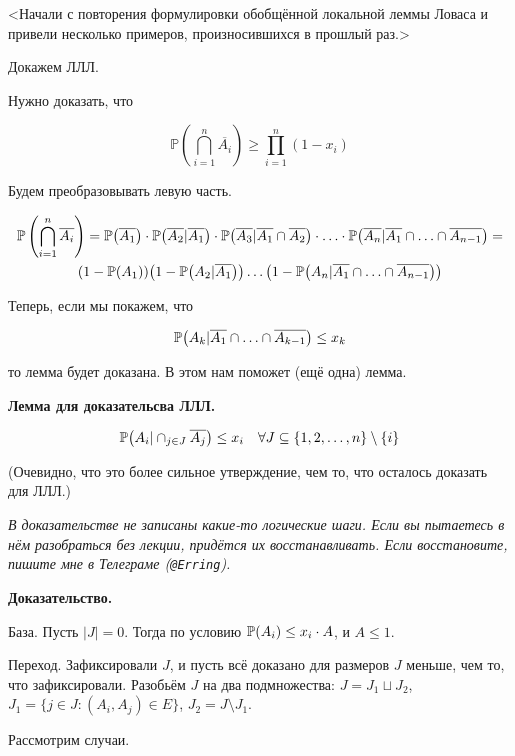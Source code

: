 \documentclass[12pt]{article}
\DeclarePairedDelimiter\autobracket{(}{)}
\newcommand{\br}[1]{\autobracket*{#1}}
\renewcommand{\P}{\mathbb{P}}
\begin{document}
<Начали с повторения формулировки обобщённой локальной леммы Ловаса и привели несколько примеров, произносившихся в прошлый раз.>

Докажем ЛЛЛ.

Нужно доказать, что

\[
\P \left( \bigcap_{i=1}^n \overline{A_i} \right) \geq \prod_{i=1}^n (1 - x_i)
\]

Будем преобразовывать левую часть.

\begin{multline*}
\P \left( \bigcap_{i=1}^n \overline{A_i} \right) =
\P \br{\overline{A_1}} \cdot
\P \br{\overline{A_2} | \overline{A_1}} \cdot
\P \br{\overline{A_3} | \overline{A_1} \cap \overline{A_2}} \cdot \ldots \cdot
\P \br{\overline{A_n} | \overline{A_1} \cap \ldots \cap \overline{A_{n-1}}} = \\
\br{1 - \P \br{A_1}}
\br{1 - \P \br{A_2 | \overline{A_1}}} \ldots
\br{1 - \P \br{A_n | \overline{A_1} \cap \ldots \cap \overline{A_{n-1}}}}
\end{multline*}

Теперь, если мы покажем, что

\[
\P \br{A_k | \overline{A_1} \cap \ldots \cap \overline{A_{k-1}}} \leq x_k
\]

то лемма будет доказана. В этом нам поможет (ещё одна) лемма.

\textbf{Лемма для доказательсва ЛЛЛ.}

\[
\P \br{ A_i | \cap_{j \in J} \overline{A_j}} \leq x_i \quad \forall J \subseteq \{ 1,2, \ldots, n \} \setminus \{ i \}
\]

(Очевидно, что это более сильное утверждение, чем то, что осталось доказать для ЛЛЛ.)

\textit{В доказательстве не записаны какие-то логические шаги. Если вы пытаетесь в нём разобраться без лекции, придётся их восстанавливать. Если восстановите, пишите мне в Телеграме (\texttt{@Erring}).}

\textbf{Доказательство.}

База. Пусть $|J| = 0$. Тогда по условию $\P \br{A_i} \leq x_i \cdot A$, и $A \leq 1$.

Переход. Зафиксировали $J$, и пусть всё доказано для размеров $J$ меньше, чем то, что зафиксировали. Разобьём $J$ на два подмножества: $J = J_1 \sqcup J_2$, $J_1 = \{ j \in J \colon (A_i, A_j) \in E \}$, $J_2 = J \setminus J_1$.

Рассмотрим случаи.
\end{document}
